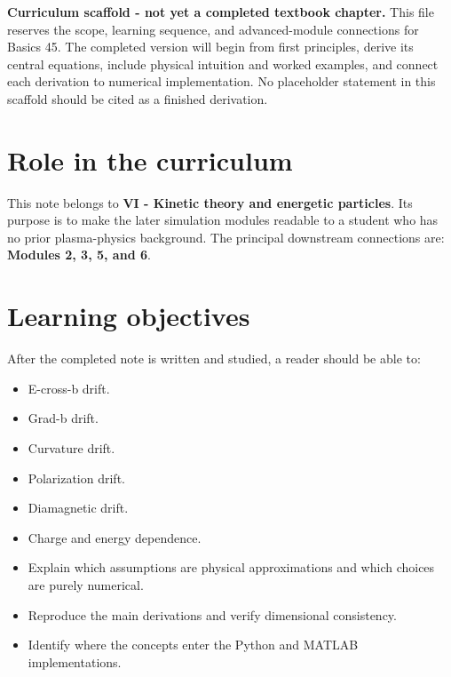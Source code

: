 \documentclass[11pt]{article}
\begin{document}

\begin{overviewbox}
\textbf{Curriculum scaffold - not yet a completed textbook chapter.} This file reserves the scope, learning sequence, and advanced-module connections for Basics 45. The completed version will begin from first principles, derive its central equations, include physical intuition and worked examples, and connect each derivation to numerical implementation. No placeholder statement in this scaffold should be cited as a finished derivation.
\end{overviewbox}

\ProjectTOC

\section{Role in the curriculum}
This note belongs to \textbf{VI - Kinetic theory and energetic particles}. Its purpose is to make the later simulation modules readable to a student who has no prior plasma-physics background. The principal downstream connections are: \textbf{Modules 2, 3, 5, and 6}.

\section{Learning objectives}
After the completed note is written and studied, a reader should be able to:
\begin{itemize}[leftmargin=1.6em]
\item E-cross-b drift.
\item Grad-b drift.
\item Curvature drift.
\item Polarization drift.
\item Diamagnetic drift.
\item Charge and energy dependence.
\item Explain which assumptions are physical approximations and which choices are purely numerical.
\item Reproduce the main derivations and verify dimensional consistency.
\item Identify where the concepts enter the Python and MATLAB implementations.
\end{itemize}
\end{document}
